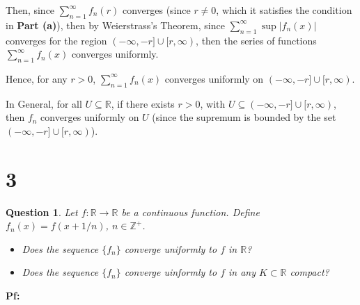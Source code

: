 \documentclass{article}
\newtheorem{question}{Question}
\begin{document}
\begin{itemize}
    Then, since $\sum_{n=1}^{\infty}f_n(r)$ converges (since $r\neq 0$, which it satisfies the condition in \textbf{Part (a)}), then by Weierstrass's Theorem, since $\sum_{n=1}^{\infty}\sup|f_n(x)|$ converges for the region $(-\infty,-r]\cup [r,\infty)$,
    then the series of functions $\sum_{n=1}^{\infty}f_n(x)$ converges uniformly.

    Hence, for any $r>0$, $\sum_{n=1}^{\infty}f_n(x)$ converges uniformly on $(-\infty,-r]\cup [r,\infty)$.

    \hfill

    In General, for all $U\subseteq \mathbb{R}$, if there exists $r>0$, with $U\subseteq (-\infty,-r]\cup [r,\infty)$, then $f_n$ converges uniformly on $U$ (since the supremum is bounded by the set $(-\infty,-r]\cup [r,\infty)$).
\end{itemize}

\break

\section*{3}
\begin{myBox}[]{}
    \begin{question}
        Let $f:\mathbb{R}\rightarrow\mathbb{R}$ be a continuous function. Define $f_n(x)=f(x+1/n)$, $n\in\mathbb{Z}^+$.
        \begin{itemize}
            \item[(a)] Does the sequence $\{f_n\}$ converge uniformly to $f$ in $\mathbb{R}$?
            \item[(b)] Does the sequence $\{f_n\}$ converge uinformly to $f$ in any $K\subset \mathbb{R}$ compact? 
        \end{itemize}
    \end{question}
\end{myBox}

\textbf{Pf:}
\end{document}

